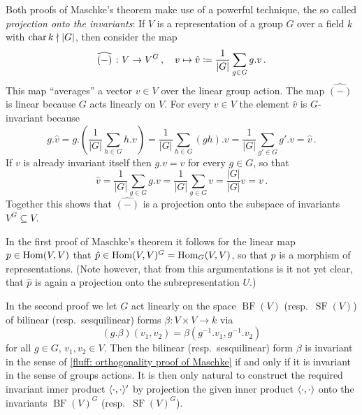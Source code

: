 \begin{remark}
  Both proofs of Maschke’s theorem make use of a powerful technique, the so called \emph{projection onto the invariants}:
  If $V$ is a representation of a group $G$ over a field $k$ with $\operatorname{char} k \nmid |G|$, then consider the map
  \[
              \widehat{(-)} \;
    \colon    V
    \to       V^G \,,
    \quad     v
    \mapsto   \hat{v}
    \coloneqq  \frac{1}{|G|} \sum_{g \in G} g.v \,.
  \]
  This map “averages” a vector $v \in V$ over the linear group action.
  The map $\widehat{(-)}$ is linear because $G$ acts linearly on $V$.
  For every $v \in V$ the element $\hat{v}$ is $G$-invariant because
  \[
      g.\hat{v}
    = g.\left( \frac{1}{|G|} \sum_{h \in G} h.v \right)
    = \frac{1}{|G|} \sum_{h \in G} (gh).v
    = \frac{1}{|G|} \sum_{g' \in G} g'.v
    = \hat{v} \,.
  \]
  If $v$ is already invariant itself then $g.v = v$ for every $g \in G$, so that
  \[
      \hat{v}
    = \frac{1}{|G|} \sum_{g \in G} g.v
    = \frac{1}{|G|} \sum_{g \in G} v
    = \frac{|G|}{|G|} v
    = v \,.
  \]
  Together this shows that $\widehat{(-)}$ is a projection onto the subspace of invariants $V^G \subseteq V$.
  
  In the first proof of Maschke’s theorem it follows for the linear map $p \in \operatorname{Hom}(V,V)$ that $\hat{p} \in \operatorname{Hom}(V,V)^G = \operatorname{Hom}_G(V,V)$, so that $\hat{p}$ is a morphism of representations.
  (Note however, that from this argumentations is it not yet clear, that $\hat{p}$ is again a projection onto the subrepresentation $U$.)
  
  In the second proof we let $G$ act linearly on the space $\operatorname{BF}(V)$ (resp.\ $\operatorname{SF}(V)$) of bilinear (resp.\ sesquilinear) forms $\beta \colon V \times V \to k$ via
  \[
      (g.\beta)(v_1, v_2)
    = \beta\left( g^{-1}.v_1, g^{-1}.v_2 \right)
  \]
  for all $g \in G$, $v_1, v_2 \in V$.
  Then the bilinear (resp.\ sesquilinear) form $\beta$ is invariant in the sense of \ref{fluff: orthogonality proof of Maschke} if and only if it is invariant in the sense of groups actions.
  It is then only natural to construct the required invariant inner product $\langle \cdot, \cdot \rangle'$ by projection the given inner product $\langle \cdot, \cdot \rangle$ onto the invariants $\operatorname{BF}(V)^G$ (resp.\ $\operatorname{SF}(V)^G$).
\end{remark}





